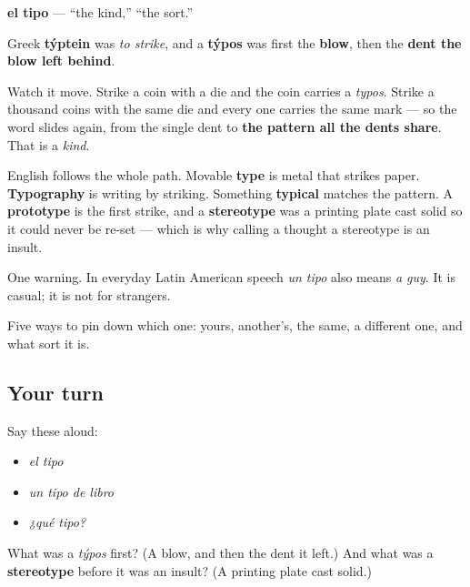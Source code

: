 \begin{cousinweb}
\textbf{el tipo} — \textquotedblleft{}the kind,\textquotedblright{} \textquotedblleft{}the sort.\textquotedblright{}

Greek \textbf{týptein} was \emph{to strike}, and a \textbf{týpos} was first the \textbf{blow}, then the \textbf{dent the blow left behind}.

Watch it move. Strike a coin with a die and the coin carries a \emph{typos}. Strike a thousand coins with the same die and every one carries the same mark — so the word slides again, from the single dent to \textbf{the pattern all the dents share}. That is a \emph{kind}.

English follows the whole path. Movable \textbf{type} is metal that strikes paper. \textbf{Typography} is writing by striking. Something \textbf{typical} matches the pattern. A \textbf{prototype} is the first strike, and a \textbf{stereotype} was a printing plate cast solid so it could never be re-set — which is why calling a thought a stereotype is an insult.

One warning. In everyday Latin American speech \emph{un tipo} also means \emph{a guy}. It is casual; it is not for strangers.
\end{cousinweb}

\begin{grammarlens}[title={What you've built}]
Five ways to pin down which one: yours, another's, the same, a different one, and what sort it is.
\end{grammarlens}

\subsection*{Your turn}
Say these aloud:

\begin{itemize}
\raggedright
  \item \emph{el tipo}
  \item \emph{un tipo de libro}
  \item \emph{¿qué tipo?}
\end{itemize}

\begin{tcolorbox}[breakable,colback=teal!4,colframe=teal!35!black,title={Before you move on}]
What was a \emph{týpos} first? (A blow, and then the dent it left.) And what was a \textbf{stereotype} before it was an insult? (A printing plate cast solid.)
\end{tcolorbox}
